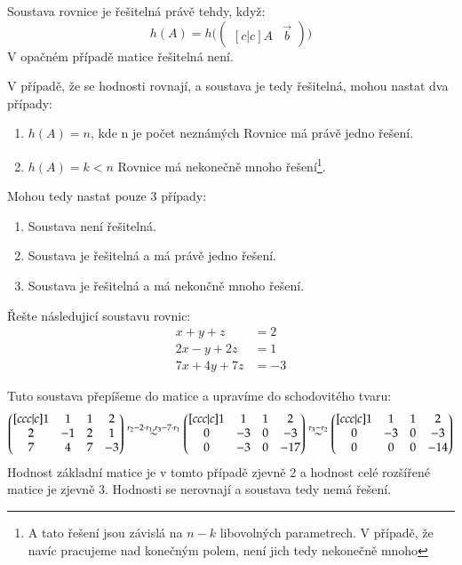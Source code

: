 Soustava rovnice je řešitelná právě tehdy, když:
\[
    h(A) = h\Bigg (
    \begin{pmatrix}[c|c]
        A & \vec{b}
    \end{pmatrix} \Bigg )
\]
V opačném případě matice řešitelná není.

V případě, že se hodnosti rovnají, a soustava je tedy řešitelná, mohou nastat dva případy:
\begin{enumerate}
    \item $h(A) = n$, kde n je počet neznámých \hfill Rovnice má právě jedno řešení.
    \item $h(A) = k < n$ \hfill Rovnice má nekonečně mnoho řešení\footnote{A tato řešení jsou
    závislá na $n-k$ libovolných parametrech. V případě, že navíc pracujeme nad konečným polem, není jich
    tedy nekonečně mnoho}.
\end{enumerate}
Mohou tedy nastat pouze 3 případy:
\begin{enumerate}
    \item Soustava není řešitelná.
    \item Soustava je řešitelná a má právě jedno řešení.
    \item Soustava je řešitelná a má nekončně mnoho řešení.
\end{enumerate}

\begin{example}
    Řešte následujicí soustavu rovnic:
    \begin{align*}
        x + y + z &= 2 \\
        2x - y + 2z &= 1 \\
        7x + 4y + 7z &= -3
    \end{align*}

    Tuto soustava přepíšeme do matice a upravíme do schodovitého tvaru:
    \[
        \begin{pmatrix}[ccc|c]
            1 & 1 & 1 & 2 \\
            2 & -1 & 2 & 1 \\
            7 & 4 & 7 & -3
        \end{pmatrix} \overset{r_2 - 2\cdot r_1, r_3 - 7\cdot r_1} \sim
        \begin{pmatrix}[ccc|c]
            1 & 1 & 1 & 2 \\
            0 & -3 & 0 & -3 \\
            0 & -3 & 0 & -17
        \end{pmatrix} \overset{r_3 - r_2} \sim
        \begin{pmatrix}[ccc|c]
            1 & 1 & 1 & 2 \\
            0 & -3 & 0 & -3 \\
            0 & 0 & 0 & -14
        \end{pmatrix}
    \]
    Hodnost základní matice je v tomto případě zjevně 2 a hodnost
    celé rozšířené matice je zjevně 3. Hodnosti se nerovnají a soustava tedy nemá řešení.
\end{example}
